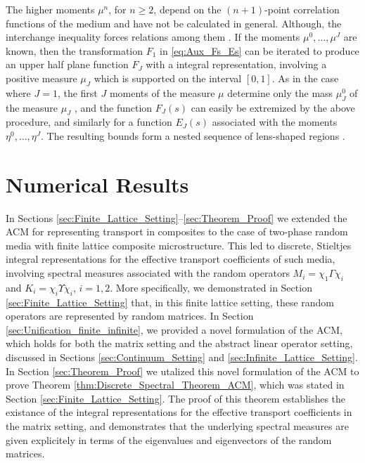 \documentclass{cmslatex}
\begin{document}
The higher moments $\mu^n$, for $n\geq2$, depend on the $(n+1)$-point
correlation functions of the medium \cite{Golden:CMP-473} and have not
be calculated in general. Although, the interchange inequality forces
relations among them \cite{Milton:JAP-5294}. If the moments
$\mu^0,\ldots,\mu^J$ are known, then the transformation $F_1$ in
\eqref{eq:Aux_Fs_Es} can be iterated to produce an upper half plane
function $F_J$ with a integral representation, involving a positive
measure $\mu_J$ which is supported on the interval $[0,1]$. As in the
case where $J=1$, the first $J$ moments of the measure $\mu$ determine
only the mass $\mu_J^0$ of the measure $\mu_J$ \cite{Golden:JMPS-333}, and
the function $F_J(s)$ can easily be extremized by the above procedure,
and similarly for a function $E_J(s)$ associated with the moments
$\eta^0,\ldots,\eta^J$. The resulting bounds form a nested sequence of
lens-shaped regions \cite{Golden:JMPS-333}.




\section{Numerical Results}\label{sec:Numerical_Results}
%
In Sections \ref{sec:Finite_Lattice_Setting}--\ref{sec:Theorem_Proof}
we extended the ACM for representing transport in composites
to the case of two-phase random media with finite lattice composite 
microstructure. This led to discrete, Stieltjes integral
representations for the effective transport coefficients of such
media, involving spectral measures associated with the random
operators $M_i=\chi_1\Gamma\chi_i$ and $K_i=\chi_i\Upsilon\chi_i$, $i=1,2$. More specifically,
we demonstrated in Section \ref{sec:Finite_Lattice_Setting} that, in
this finite lattice setting, these random operators are represented by
random matrices. In Section \ref{sec:Unification_finite_infinite}, we
provided a novel formulation of the ACM, which holds for both the
matrix setting and the abstract linear operator setting, discussed in
Sections \ref{sec:Continuum_Setting} and
\ref{sec:Infinite_Lattice_Setting}. In Section \ref{sec:Theorem_Proof}
we utalized this novel formulation of the ACM to prove Theorem 
\ref{thm:Discrete_Spectral_Theorem_ACM}, which was stated in Section  
\ref{sec:Finite_Lattice_Setting}. The proof of this theorem
establishes the existance of the integral representations for the
effective transport coefficients in the matrix setting, and
demonstrates that the underlying spectral measures are given
explicitely in terms of the eigenvalues and eigenvectors of the random
matrices. 
\end{document}
